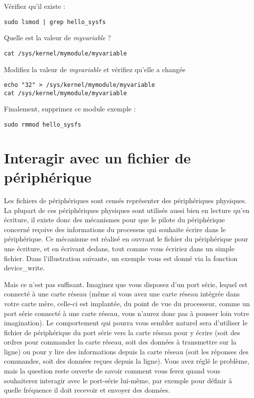 \documentclass[11pt]{article}
\begin{document}
Vérifiez qu'il existe :

\begin{verbatim}
sudo lsmod | grep hello_sysfs
\end{verbatim}

Quelle est la valeur de \emph{myvariable} ?

\begin{verbatim}
cat /sys/kernel/mymodule/myvariable
\end{verbatim}

Modifiez la valeur de \emph{myvariable} et vérifiez qu'elle a changée

\begin{verbatim}
echo "32" > /sys/kernel/mymodule/myvariable
cat /sys/kernel/mymodule/myvariable
\end{verbatim}

Finalement, supprimez ce module exemple :

\begin{verbatim}
sudo rmmod hello_sysfs
\end{verbatim}

\section*{Interagir avec un fichier de périphérique}
\label{sec-9}

Les fichiers de périphériques sont censés représenter des périphériques physiques. La plupart de ces périphériques physiques sont utilisés aussi bien en lecture qu'en écriture, il existe donc des mécanismes pour que le pilote du périphérique concerné reçoive des informations du processus qui souhaite écrire dans le périphérique. Ce mécanisme est réalisé en ouvrant le fichier du périphérique pour une écriture, et en écrivant dedans, tout comme vous écririez dans un simple fichier. Dans l'illustration suivante, un exemple vous est donné via la fonction device\_write.

Mais ce n'est pas suffisant. Imaginez que vous disposez d'un port série, lequel est connecté à une carte réseau (même si vous avez une carte réseau intégrée dans votre carte mère, celle-ci est implantée, du point de vue du processeur, comme un port série connecté à une carte réseau, vous n'aurez donc pas à pousser loin votre imagination). Le comportement qui pourra vous sembler naturel sera d'utiliser le fichier de périphérique du port série vers la carte réseau pour y écrire (soit des ordres pour commander la carte réseau, soit des données à transmettre sur la ligne) ou pour y lire des informations depuis la carte réseau (soit les réponses des commandes, soit des données reçues depuis la ligne). Vous avez réglé le problème, mais la question reste ouverte de savoir comment vous ferez quand vous souhaiterez interagir avec le port-série lui-même, par exemple pour définir à quelle fréquence il doit recevoir et envoyer des données.
\end{document}
